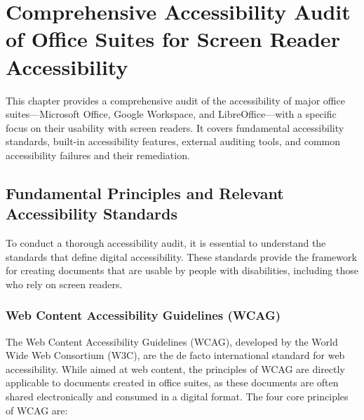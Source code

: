 \chapter{Comprehensive Accessibility Audit of Office Suites for Screen Reader Accessibility}
\label{chap:office-suite-accessibility}

This chapter provides a comprehensive audit of the accessibility of major office suites—Microsoft Office, Google Workspace, and LibreOffice—with a specific focus on their usability with screen readers. It covers fundamental accessibility standards, built-in accessibility features, external auditing tools, and common accessibility failures and their remediation.

\section{Fundamental Principles and Relevant Accessibility Standards}
\label{sec:office-accessibility-standards}

To conduct a thorough accessibility audit, it is essential to understand the standards that define digital accessibility. These standards provide the framework for creating documents that are usable by people with disabilities, including those who rely on screen readers.

\subsection{Web Content Accessibility Guidelines (WCAG)}
\label{subsec:wcag-office}

The Web Content Accessibility Guidelines (WCAG), developed by the World Wide Web Consortium (W3C), are the de facto international standard for web accessibility. While aimed at web content, the principles of WCAG are directly applicable to documents created in office suites, as these documents are often shared electronically and consumed in a digital format. The four core principles of WCAG are:

